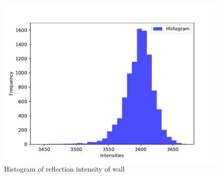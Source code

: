   \begin{figure}[h]
    \centering
    \includegraphics[keepaspectratio, scale=0.55] {images/pdf/RobotGuidance_plot_reflection_intensities_of_wall}
    \captionsetup{justification=raggedright} %
    \caption{Histogram of reflection intensity of wall}
    \label{Fig:Normal distribution of reflection intensity of wall}
  \end{figure}

\newpage